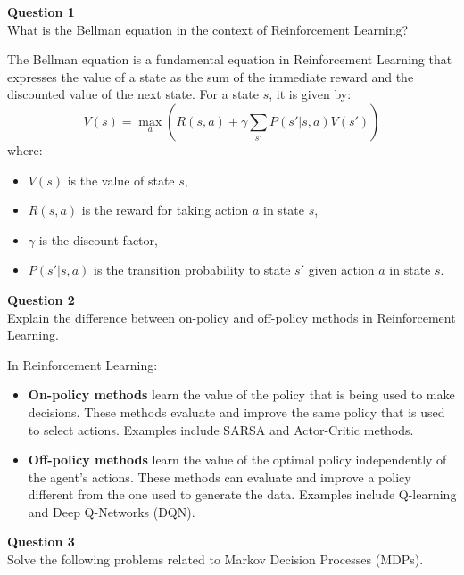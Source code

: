 \documentclass[addpoints]{exam}
\begin{document}
\begin{questions}
    \question
    \textbf{Question 1} \\ What is the Bellman equation in the context of Reinforcement Learning?
    \begin{solution}
        The Bellman equation is a fundamental equation in Reinforcement Learning that expresses the value of a state as the sum of the immediate reward and the discounted value of the next state. For a state \( s \), it is given by:
        \[
        V(s) = \max_a \left( R(s, a) + \gamma \sum_{s'} P(s' | s, a) V(s') \right)
        \]
        where:
        \begin{itemize}
            \item \( V(s) \) is the value of state \( s \),
            \item \( R(s, a) \) is the reward for taking action \( a \) in state \( s \),
            \item \( \gamma \) is the discount factor,
            \item \( P(s' | s, a) \) is the transition probability to state \( s' \) given action \( a \) in state \( s \).
        \end{itemize}
    \end{solution}

    \question
    \textbf{Question 2} \\ Explain the difference between on-policy and off-policy methods in Reinforcement Learning.
    \begin{solution}
        In Reinforcement Learning:
        \begin{itemize}
            \item \textbf{On-policy methods} learn the value of the policy that is being used to make decisions. These methods evaluate and improve the same policy that is used to select actions. Examples include SARSA and Actor-Critic methods.
            \item \textbf{Off-policy methods} learn the value of the optimal policy independently of the agent's actions. These methods can evaluate and improve a policy different from the one used to generate the data. Examples include Q-learning and Deep Q-Networks (DQN).
        \end{itemize}
    \end{solution}

    \question
    \textbf{Question 3} \\ Solve the following problems related to Markov Decision Processes (MDPs).
    \begin{parts}

\end{parts}
\end{questions}
\end{document}
